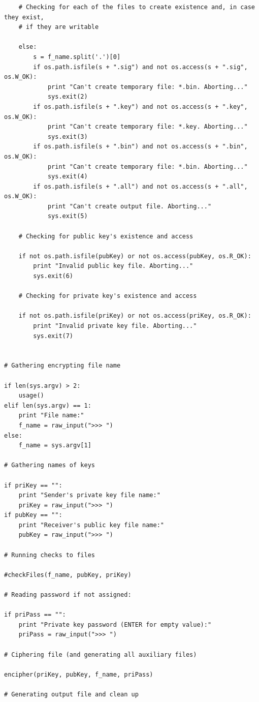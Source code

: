 \documentclass[a4paper,11pt,openright,oneside]{report}
\begin{document}
\begin{appendices}
\begin{verbatim}
    # Checking for each of the files to create existence and, in case they exist,
    # if they are writable

    else:
        s = f_name.split('.')[0]
        if os.path.isfile(s + ".sig") and not os.access(s + ".sig", os.W_OK):
            print "Can't create temporary file: *.bin. Aborting..."
            sys.exit(2)
        if os.path.isfile(s + ".key") and not os.access(s + ".key", os.W_OK):
            print "Can't create temporary file: *.key. Aborting..."
            sys.exit(3)
        if os.path.isfile(s + ".bin") and not os.access(s + ".bin", os.W_OK):
            print "Can't create temporary file: *.bin. Aborting..."
            sys.exit(4)
        if os.path.isfile(s + ".all") and not os.access(s + ".all", os.W_OK):
            print "Can't create output file. Aborting..."
            sys.exit(5)

    # Checking for public key's existence and access

    if not os.path.isfile(pubKey) or not os.access(pubKey, os.R_OK):
        print "Invalid public key file. Aborting..."
        sys.exit(6)

    # Checking for private key's existence and access

    if not os.path.isfile(priKey) or not os.access(priKey, os.R_OK):
        print "Invalid private key file. Aborting..."
        sys.exit(7)


# Gathering encrypting file name

if len(sys.argv) > 2:
    usage()
elif len(sys.argv) == 1:
    print "File name:"
    f_name = raw_input(">>> ")
else:
    f_name = sys.argv[1]

# Gathering names of keys

if priKey == "":
    print "Sender's private key file name:"
    priKey = raw_input(">>> ")
if pubKey == "":
    print "Receiver's public key file name:"
    pubKey = raw_input(">>> ")

# Running checks to files

#checkFiles(f_name, pubKey, priKey)

# Reading password if not assigned:

if priPass == "":
    print "Private key password (ENTER for empty value):"
    priPass = raw_input(">>> ")

# Ciphering file (and generating all auxiliary files)

encipher(priKey, pubKey, f_name, priPass)

# Generating output file and clean up


\end{verbatim}
\end{appendices}
\end{document}
